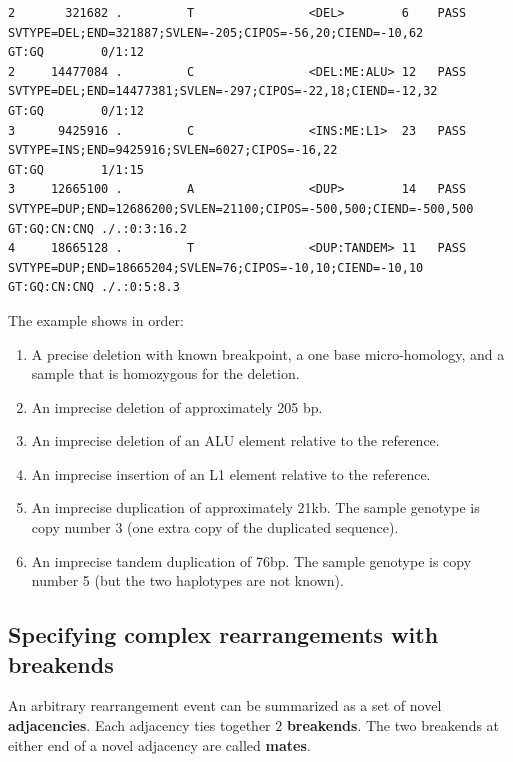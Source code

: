 \documentclass[8pt]{article}
\begin{document}
\begin{landscape}
\begin{verbatim}
2       321682 .         T                <DEL>        6    PASS   SVTYPE=DEL;END=321887;SVLEN=-205;CIPOS=-56,20;CIEND=-10,62         GT:GQ        0/1:12
2     14477084 .         C                <DEL:ME:ALU> 12   PASS   SVTYPE=DEL;END=14477381;SVLEN=-297;CIPOS=-22,18;CIEND=-12,32       GT:GQ        0/1:12
3      9425916 .         C                <INS:ME:L1>  23   PASS   SVTYPE=INS;END=9425916;SVLEN=6027;CIPOS=-16,22                     GT:GQ        1/1:15
3     12665100 .         A                <DUP>        14   PASS   SVTYPE=DUP;END=12686200;SVLEN=21100;CIPOS=-500,500;CIEND=-500,500  GT:GQ:CN:CNQ ./.:0:3:16.2
4     18665128 .         T                <DUP:TANDEM> 11   PASS   SVTYPE=DUP;END=18665204;SVLEN=76;CIPOS=-10,10;CIEND=-10,10         GT:GQ:CN:CNQ ./.:0:5:8.3
\end{verbatim}
\end{landscape}
\pagebreak
\normalsize

The example shows in order:
\begin{enumerate}
  \item A precise deletion with known breakpoint, a one base micro-homology, and a sample that is homozygous for the deletion.
  \item An imprecise deletion of approximately 205 bp.
  \item An imprecise deletion of an ALU element relative to the reference.
  \item An imprecise insertion of an L1 element relative to the reference.
  \item An imprecise duplication of approximately 21kb. The sample genotype is copy number 3 (one extra copy of the duplicated sequence).
  \item An imprecise tandem duplication of 76bp. The sample genotype is copy number 5 (but the two haplotypes are not known).
\end{enumerate}

\subsection{Specifying complex rearrangements with breakends}

An arbitrary rearrangement event can be summarized as a set of novel \textbf{adjacencies}. Each adjacency ties together $2$ \textbf{breakends}. The two breakends at either end of a novel adjacency are called \textbf{mates}.
\end{document}
